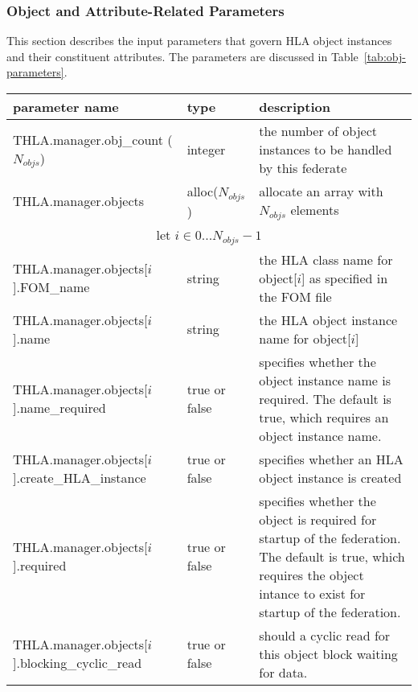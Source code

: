 \subsubsection{Object and Attribute-Related Parameters}

This section describes the input parameters that govern HLA
object instances and their constituent attributes.
The parameters are discussed in Table~\ref{tab:obj-parameters}.

\begin{table}[h]
  \scriptsize
  \begin{center}
    \begin{tabular}{|p{2in}|l|p{3.25in}|}
    \hline
    parameter name & type & description \\
    \hline \hline
    {\ttfamily THLA.manager.obj\_count}
    ($N_{objs}$)
    & integer
    & the number of object instances to be handled by this federate
    \\
    \hline
    {\ttfamily THLA.manager.objects} & alloc($N_{objs}$)
    & allocate an array with $N_{objs}$ elements
    \\
    \hline
    \hline
    \multicolumn{3}{|c|}{
      \rule[-3mm]{0mm}{7mm}
      let $i \in 0...N_{objs}-1$
    }
    \\
    \hline
    {\ttfamily THLA.manager.objects[$i$].\-FOM\_name}
    & string
    & the HLA class name for object[$i$] as specified in the FOM file
    \\
    \hline
    {\ttfamily THLA.manager.objects[$i$].\-name}
    & string
    & the HLA object instance name for object[$i$]
    \\
    \hline
    {\ttfamily THLA.manager.objects[$i$].\-name\_required}
    & true or false
    & specifies whether the object instance name is required.
    The default is true, which requires an object instance name.
    \\
    \hline
    {\ttfamily THLA.manager.objects[$i$].\-create\_HLA\_instance}
    & true or false
    & specifies whether an HLA object instance is created 
    \\
    \hline
    {\ttfamily THLA.manager.objects[$i$].\-required}
    & true or false
    & specifies whether the object is required for startup of the federation.
    The default is true, which requires the object intance to exist for startup
    of the federation.
    \\
    \hline
    {\ttfamily THLA.manager.objects[$i$].\-blocking\_cyclic\_read}
    & true or false
    & should a cyclic read for this object block waiting for data.

\end{tabular}
\end{center}
\end{table}
